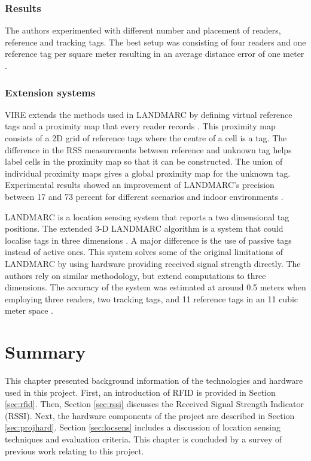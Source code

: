 \subsubsection{Results}

The authors experimented with different number and placement of readers, reference and tracking tags. The best setup was consisting of four readers and one reference tag per square meter resulting in an average distance error of one meter \cite{Ni2004}.

\subsubsection{Extension systems}

VIRE extends the methods used in LANDMARC by defining virtual reference tags and a proximity map that every reader records \cite{Zhao2007}. This proximity map consists of a 2D grid of reference tags where the centre of a cell is a tag. The difference in the RSS measurements between reference and unknown tag helps label cells in the proximity map so that it can be constructed. The union of individual proximity maps gives a global proximity map for the unknown tag. Experimental results showed an improvement of LANDMARC's precision between 17 and 73 percent for different scenarios and indoor environments \cite{Zhao2007}.

LANDMARC is a location sensing system that reports a two dimensional tag positions. The extended 3-D LANDMARC algorithm is a system that could localise tags in three dimensions \cite{Khan2009}. A major difference is the use of passive tags instead of active ones. This system solves some of the original limitations of LANDMARC by using hardware providing received signal strength directly. The authors rely on similar methodology, but extend computations to three dimensions. The accuracy of the system was estimated at around 0.5 meters when employing three readers, two tracking tags, and 11 reference tags in an 11 cubic meter space \cite{Khan2009}.


\section{Summary}

This chapter presented background information of the technologies and hardware used in this project. First, an introduction of RFID is provided in Section \ref{sec:rfid}.  Then, Section \ref{sec:rssi} discusses the Received Signal Strength Indicator (RSSI). Next, the hardware components of the project are described in Section \ref{sec:projhard}. Section \ref{sec:locsens} includes a discussion of location sensing techniques and evaluation criteria. This chapter is concluded by a survey of previous work relating to this project.
